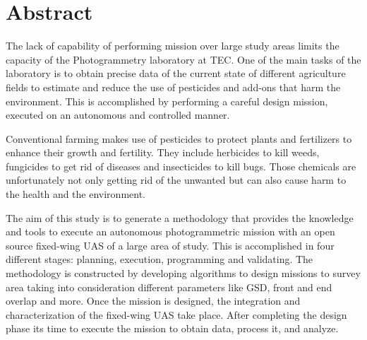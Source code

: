 \section{Abstract}
The lack of capability of performing mission over large study areas limits the capacity of the Photogrammetry laboratory at TEC. One of the main tasks of the laboratory is to obtain precise data of the current state of different agriculture fields to estimate and reduce the use of pesticides and add-ons that harm the environment. This is accomplished by performing a careful design mission, executed on an autonomous and controlled manner.

Conventional farming makes use of pesticides to protect plants and fertilizers to enhance their growth and fertility. They include herbicides to kill weeds, fungicides to get rid of diseases and insecticides to kill bugs. Those chemicals are unfortunately not only getting rid of the unwanted but can also cause harm to the health and the environment.

The aim of this study is to generate a methodology that provides the knowledge and tools to execute an autonomous photogrammetric mission with an open source fixed-wing UAS of a large area of study. This is accomplished in four different stages: planning, execution, programming and validating. The methodology is constructed by developing algorithms to design missions to survey area taking into consideration different parameters like GSD, front and end overlap and more. Once the mission is designed, the integration and characterization of the fixed-wing UAS take place. After completing the design phase its time to execute the mission to obtain data,  process it, and analyze.